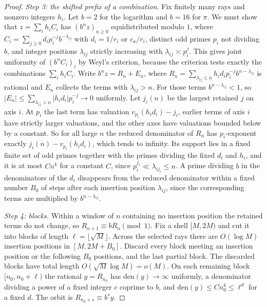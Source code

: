 \documentclass[11pt]{article}
\begin{document}
\begin{proof}
\emph{Step 3: the shifted prefix of a combination.} Fix finitely many rays and nonzero integers $h_i$. Let $b=2$ for the logarithm and $b=16$ for $\pi$. We must show that $z=\sum_ih_iC_i$ has $(b^nz)_{n\ge0}$ equidistributed modulo $1$, where $C_i=\sum_{j\ge0}d_ip_i^{-j}b^{-\lambda_{ij}}$ with $d_i=1/r_i$ or $c_a/r_i$, distinct odd primes $p_i$ not dividing $b$, and integer positions $\lambda_{ij}$ strictly increasing with $\lambda_{ij}\asymp p_i^j$. This gives joint uniformity of $(b^nC_i)_i$ by Weyl's criterion, because the criterion tests exactly the combinations $\sum_ih_iC_i$. Write $b^nz=R_n+E_n$, where $R_n=\sum_{\lambda_{ij}\le n}h_id_ip_i^{-j}b^{n-\lambda_{ij}}$ is rational and $E_n$ collects the terms with $\lambda_{ij}>n$. For those terms $b^{n-\lambda_{ij}}<1$, so $|E_n|\le\sum_{\lambda_{ij}>n}|h_id_i|p_i^{-j}\to0$ uniformly. Let $j_i(n)$ be the largest retained $j$ on axis $i$. At $p_i$ the last term has valuation $v_{p_i}(h_id_i)-j_i$, earlier terms of axis $i$ have strictly larger valuations, and the other axes have valuations bounded below by a constant. So for all large $n$ the reduced denominator of $R_n$ has $p_i$-exponent exactly $j_i(n)-v_{p_i}(h_id_i)$, which tends to infinity. Its support lies in a fixed finite set of odd primes together with the primes dividing the fixed $d_i$ and $h_i$, and it is at most $Cn^{k}$ for a constant $C$, since $p_i^{j_i}\ll\lambda_{ij_i}\le n$. A prime dividing $b$ in the denominators of the $d_i$ disappears from the reduced denominator within a fixed number $B_0$ of steps after each insertion position $\lambda_{ij}$, since the corresponding terms are multiplied by $b^{n-\lambda_{ij}}$.

\emph{Step 4: blocks.} Within a window of $n$ containing no insertion position the retained terms do not change, so $R_{n+1}\equiv bR_n\pmod1$. Fix a shell $[M,2M)$ and cut it into blocks of length $\ell=\lfloor\sqrt M\rfloor$. Across the selected rays there are $O(\log M)$ insertion positions in $[M,2M+B_0]$. Discard every block meeting an insertion position or the following $B_0$ positions, and the last partial block. The discarded blocks have total length $O(\sqrt M\log M)=o(M)$. On each remaining block $[n_0,n_0+\ell)$ the rational $y=R_{n_0}$ has $\mathrm{den}(y)\to\infty$ uniformly, a denominator dividing a power of a fixed integer $c$ coprime to $b$, and $\mathrm{den}(y)\le Cn_0^k\le\ell^{d}$ for a fixed $d$. The orbit is $R_{n_0+s}\equiv b^sy$.


\end{proof}
\end{document}
